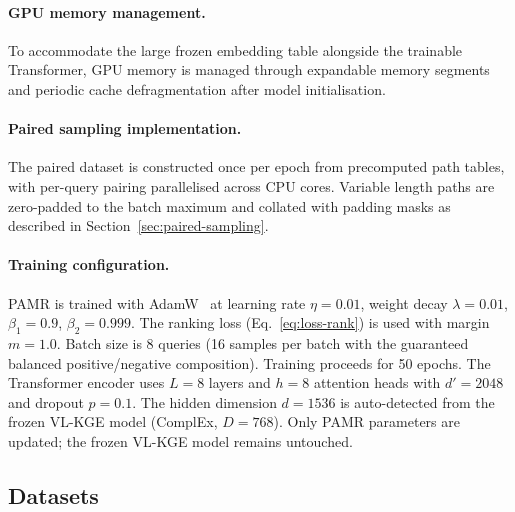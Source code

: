 \documentclass[runningheads]{llncs}
\begin{document}
\paragraph{GPU memory management.}
To accommodate the large frozen embedding table alongside the trainable
Transformer, GPU memory is managed through expandable memory segments
and periodic cache defragmentation after model initialisation.

\paragraph{Paired sampling implementation.}
The paired dataset is constructed once per epoch from precomputed
path tables, with per-query pairing parallelised across CPU cores.
Variable length paths are zero-padded to the batch maximum and
collated with padding masks as described in
Section~\ref{sec:paired-sampling}.

\paragraph{Training configuration.}
PAMR is trained with AdamW~\cite{loshchilov2019decoupled} at learning
rate $\eta = 0.01$, weight decay $\lambda = 0.01$, $\beta_1 = 0.9$,
$\beta_2 = 0.999$. The ranking loss (Eq.~\ref{eq:loss-rank}) is
used with margin $m = 1.0$. Batch size is 8 queries (16 samples per
batch with the guaranteed balanced positive/negative composition).
Training proceeds for 50 epochs. The Transformer encoder uses
$L = 8$ layers and $h = 8$ attention heads with
$d' = 2048$ and dropout $p = 0.1$. The hidden dimension
$d = 1536$ is auto-detected from the frozen VL-KGE
model (ComplEx, $D = 768$). Only PAMR parameters are updated; the
frozen VL-KGE model remains untouched.

\subsection{Datasets}
\label{sec:datasets}
\end{document}
